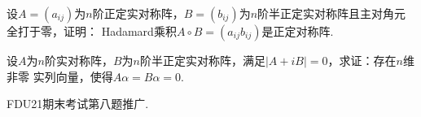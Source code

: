 \begin{groups}
    \begin{questions}
        \question 
        设$A=(a_{ij})$为$n$阶正定实对称阵，$B=(b_{ij})$为$n$阶半正定实对称阵且主对角元全打于零，证明：
        Hadamard乘积$A\circ B = (a_{ij} b_{ij})$是正定对称阵.
    \end{questions}

    \begin{questions}
        \question 
        设$A$为$n$阶实对称阵，$B$为$n$阶半正定实对称阵，满足$|A+iB|=0$，求证：存在$n$维非零
        实列向量，使得$A\alpha = B \alpha = 0$.
    \end{questions}
    
    \begin{remark}
        FDU21期末考试第八题推广.
    \end{remark}

    
\end{groups}